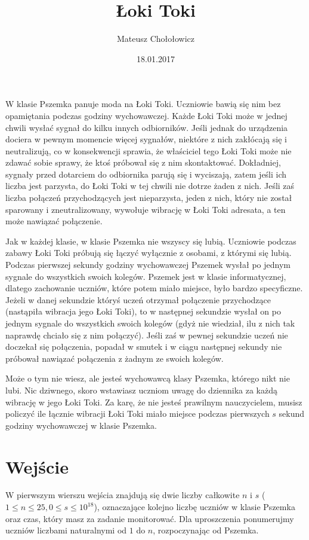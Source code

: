 \documentclass[zad,zawodnik,utf8]{sinol}
\title{Łoki Toki}
\author{Mateusz Chołołowicz} %
\date{18.01.2017}
\begin{document}
\begin{tasktext}%
W klasie Pszemka panuje moda na Łoki Toki. Uczniowie bawią się nim bez opamiętania podczas godziny wychowawczej. Każde Łoki Toki może w jednej chwili
wysłać sygnał do kilku innych odbiorników. Jeśli jednak do urządzenia dociera w pewnym momencie więcej sygnałów, niektóre z nich zakłócają się i neutralizują, co w 
konsekwencji sprawia, że właściciel tego Łoki Toki może nie zdawać sobie sprawy, że ktoś próbował się z nim skontaktować. Dokładniej, sygnały
przed dotarciem do odbiornika parują się i wyciszają, zatem jeśli ich liczba jest parzysta, do Łoki Toki w tej chwili nie dotrze żaden z nich.
Jeśli zaś liczba połączeń przychodzących jest nieparzysta, jeden z nich, który nie został sparowany i zneutralizowany, wywołuje wibrację w Łoki Toki
adresata, a ten może nawiązać połączenie. 

Jak w każdej klasie, w klasie Pszemka nie wszyscy się lubią. Uczniowie podczas zabawy Łoki Toki próbują się łączyć wyłącznie z osobami, z którymi się lubią.
Podczas pierwszej sekundy godziny wychowawczej Pszemek wysłał po jednym sygnale do wszystkich swoich kolegów. Pszemek jest w klasie informatycznej, dlatego
zachowanie uczniów, które potem miało miejsce, było bardzo specyficzne. Jeżeli w danej sekundzie któryś uczeń otrzymał połączenie przychodzące 
(nastąpiła wibracja jego Łoki Toki), to w następnej sekundzie wysłał on po jednym sygnale do wszystkich swoich kolegów (gdyż nie wiedział, ilu z nich tak 
naprawdę chciało się z nim połączyć). Jeśli zaś w pewnej sekundzie uczeń nie doczekał się połączenia, popadał w smutek i w ciągu następnej sekundy
nie próbował nawiązać połączenia z żadnym ze swoich kolegów.

Może o tym nie wiesz, ale jesteś wychowawcą klasy Pszemka, którego nikt nie lubi. Nic dziwnego, skoro wstawiasz uczniom uwagę do dziennika za każdą
wibrację w jego Łoki Toki. Za karę, że nie jesteś prawilnym nauczycielem, musisz policzyć ile łącznie wibracji Łoki Toki miało miejsce podczas
pierwszych $s$ sekund godziny wychowawczej w klasie Pszemka.

  \section{Wejście}
W pierwszym wierszu wejścia znajdują się dwie liczby całkowite $n$ i $s$ ($1 \leq n \leq 25, 0 \leq s \leq 10^{18}$), oznaczające kolejno
liczbę uczniów w klasie Pszemka oraz czas, który masz za zadanie monitorować. Dla uproszczenia ponumerujmy uczniów liczbami naturalnymi od $1$ do $n$,
rozpoczynając od Pszemka. 


\end{tasktext}
\end{document}
